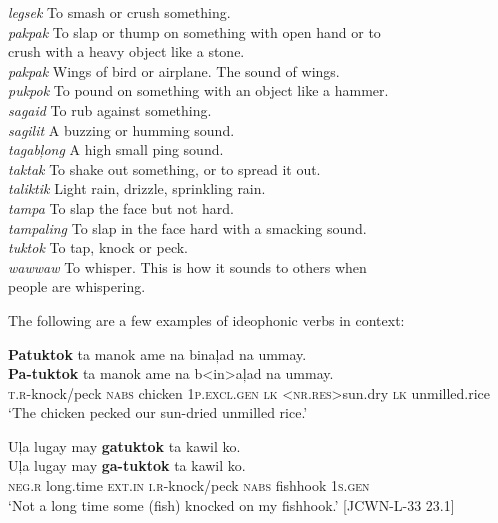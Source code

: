 \begin{tabbing}
\textit{legsek}    \>   To smash or crush something. \\
\textit{pakpak}   \>  To slap or thump on something with open hand or to \\
\> crush with a heavy object like a stone. \\
\textit{pakpak} \>   Wings of bird or airplane. The sound of wings. \\
\textit{pukpok}  \>   To pound on something with an object like a hammer. \\
\textit{sagaid}   \>  To rub against something. \\
\textit{sagilit}    \>   A buzzing or humming sound. \\
\textit{tagabļong} \>    A high small ping sound. \\
\textit{taktak}      \> To shake out something, or to spread it out. \\
\textit{taliktik}   \>   Light rain, drizzle, sprinkling rain. \\
\textit{tampa}    \>   To slap the face but not hard. \\
\textit{tampaling}  \>  To slap in the face hard with a smacking sound. \\
\textit{tuktok}    \>  To tap, knock or peck. \\
\textit{wawwaw}   \>  To whisper. This is how it sounds to others when \\
\> people are whispering.
\end{tabbing}
\z

The following are a few examples of ideophonic verbs in context:

\newpage
\ea
\textbf{Patuktok} ta manok ame na binaļad na ummay. \\\smallskip
\gll \textbf{Pa-tuktok} ta manok ame na b<in>aļad na ummay. \\
\textsc{t.r}-knock/peck	\textsc{nabs}	chicken	1\textsc{p.excl.gen}	\textsc{lk}	<\textsc{nr.res}>sun.dry	\textsc{lk}	unmilled.rice \\
\glt `The chicken pecked our sun-dried unmilled rice.'
\z

\ea
Uļa  lugay  may  \textbf{gatuktok}  ta  kawil  ko. \\\smallskip
\gll Uļa  lugay  may  \textbf{ga-tuktok}  ta  kawil  ko. \\
\textsc{neg.r}   long.time  \textsc{ext.in}  \textsc{i.r}-knock/peck  \textsc{nabs}  fishhook  1\textsc{s.gen} \\
\glt ‘Not a long time some (fish) knocked on my fishhook.’ [JCWN-L-33 23.1]
\z

